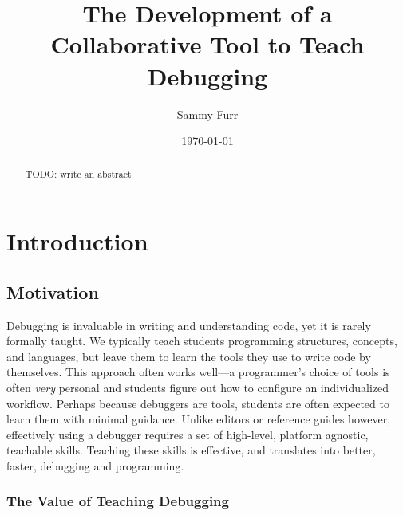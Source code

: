 \documentclass[12pt]{article}
\author{Sammy Furr}
\title{The Development of a Collaborative Tool to Teach Debugging}
\date{\today}
\begin{document}
\begin{titlepage}
  \maketitle
\end{titlepage}

\begin{abstract}
  TODO: write an abstract
\end{abstract}

\tableofcontents
\pagebreak

\section{Introduction}
\subsection{Motivation}

Debugging is invaluable in writing and understanding code, yet it is
rarely formally taught\cite{doi:10.1080/08993400802114581}.  We
typically teach students programming structures, concepts, and
languages, but leave them to learn the tools they use to write code by
themselves.  This approach often works well---a programmer's choice of
tools is often \textit{very} personal and students figure out how to
configure an individualized workflow.  Perhaps because debuggers are
tools, students are often expected to learn them with minimal
guidance.  Unlike editors or reference guides however, effectively
using a debugger requires a set of high-level, platform agnostic,
teachable skills.  Teaching these skills is effective, and translates
into better, faster, debugging and
programming\cite{10.1145/3286960.3286970}\cite{10.1145/3361721.3361724}.

\subsubsection{The Value of Teaching Debugging}
\end{document}
